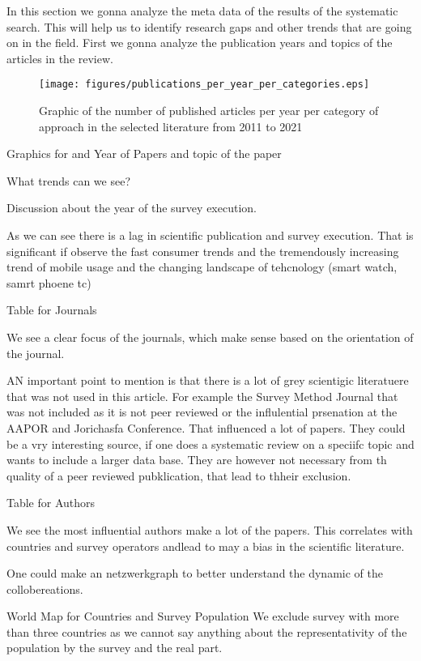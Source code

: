 In this section we gonna analyze the meta data of the results of the systematic search. This will help us to identify research gaps and other trends that are going on in the field. First we gonna analyze the publication years and topics of the articles in the review.

\begin{figure}
    \centering
    \texttt{[image: figures/publications\_per\_year\_per\_categories.eps]}
     \caption{Graphic of the number of published articles per year per category of approach in the selected literature from 2011 to 2021}
    \label{fig: publications_per_year_per_categories}
\end{figure}

Graphics for and Year of Papers and topic of the paper

What trends can we see?

Discussion about the year of the survey execution.

As we can see there is a lag in scientific publication and survey execution. That is significant if observe the fast consumer trends and the tremendously increasing trend of mobile usage and the changing landscape of tehcnology (smart watch, samrt phoene tc)

Table for Journals

We see a clear focus of the journals, which make sense based on the orientation of the journal. 

AN important point to mention is that there is a lot of grey scientigic literatuere that was not used in this article. For example the Survey Method Journal that was not included as it is not peer reviewed or the influlential prsenation at the AAPOR and Jorichasfa Conference. That influenced a lot of papers. They could be a vry interesting source, if one does a systematic review on a speciifc topic and wants to include a larger data base. They are however not necessary from th quality of a peer reviewed pubklication, that lead to thheir exclusion. 

Table for Authors

We see the most influential authors make a lot of the papers. This correlates with countries and survey operators andlead to may a bias in the scientific literature.

One could make an netzwerkgraph to better understand the dynamic of the collobereations.

World Map for Countries and Survey Population
We exclude survey with more than three countries as we cannot say anything about the representativity of the population by the survey and the real part.


